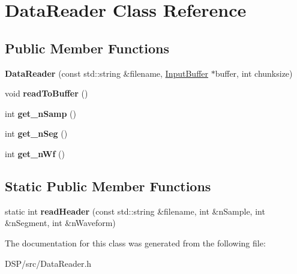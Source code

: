 \hypertarget{classDataReader}{\section{Data\-Reader Class Reference}
\label{classDataReader}
}
\subsection*{Public Member Functions}
\begin{DoxyCompactItemize}
\item 
\hypertarget{classDataReader_a11f1b8c98c7cd0f0998b6df84a0e1ea8}{{\bfseries Data\-Reader} (const std\-::string \&filename, \hyperlink{classRingbuffer}{Input\-Buffer} $\ast$buffer, int chunksize)}\label{classDataReader_a11f1b8c98c7cd0f0998b6df84a0e1ea8}

\item 
\hypertarget{classDataReader_aefb5de1f5a148eaef4b317dc93cf61d5}{void {\bfseries read\-To\-Buffer} ()}\label{classDataReader_aefb5de1f5a148eaef4b317dc93cf61d5}

\item 
\hypertarget{classDataReader_a8ada95ad5aca5fbb3e50f0b6a954a623}{int {\bfseries get\-\_\-n\-Samp} ()}\label{classDataReader_a8ada95ad5aca5fbb3e50f0b6a954a623}

\item 
\hypertarget{classDataReader_a94f681f6c77c9ad57c09b26fc367084b}{int {\bfseries get\-\_\-n\-Seg} ()}\label{classDataReader_a94f681f6c77c9ad57c09b26fc367084b}

\item 
\hypertarget{classDataReader_ad754d5ff3d2e833aaabf9460f47a77e4}{int {\bfseries get\-\_\-n\-Wf} ()}\label{classDataReader_ad754d5ff3d2e833aaabf9460f47a77e4}

\end{DoxyCompactItemize}
\subsection*{Static Public Member Functions}
\begin{DoxyCompactItemize}
\item 
\hypertarget{classDataReader_a92348a971a3d82d9b5a785f254c1b290}{static int {\bfseries read\-Header} (const std\-::string \&filename, int \&n\-Sample, int \&n\-Segment, int \&n\-Waveform)}\label{classDataReader_a92348a971a3d82d9b5a785f254c1b290}

\end{DoxyCompactItemize}


The documentation for this class was generated from the following file\-:\begin{DoxyCompactItemize}
\item 
D\-S\-P/src/Data\-Reader.\-h\end{DoxyCompactItemize}
